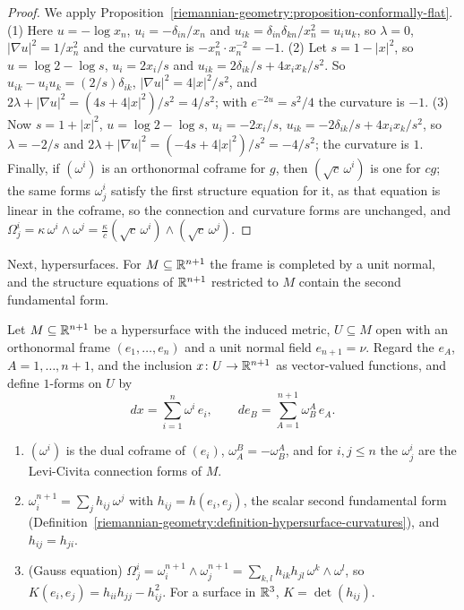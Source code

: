 \begin{proof}
We apply Proposition~\ref{riemannian-geometry:proposition-conformally-flat}. (1) Here $u = -\log x_n$, $u_i = -\delta_{in}/x_n$ and $u_{ik} = \delta_{in}\delta_{kn}/x_n^2 = u_iu_k$, so $\lambda = 0$,
$|\nabla u|^2 = 1/x_n^2$ and the curvature is $-x_n^2 \cdot x_n^{-2} = -1$. (2) Let $s = 1 - |x|^2$, so $u = \log2 - \log s$, $u_i = 2x_i/s$ and $u_{ik} = 2\delta_{ik}/s + 4x_ix_k/s^2$. So
$u_{ik} - u_iu_k = (2/s)\delta_{ik}$, $|\nabla u|^2 = 4|x|^2/s^2$, and $2\lambda + |\nabla u|^2 = (4s + 4|x|^2)/s^2 = 4/s^2$; with $e^{-2u} = s^2/4$ the curvature is $-1$. (3) Now $s = 1 + |x|^2$,
$u = \log2 - \log s$, $u_i = -2x_i/s$, $u_{ik} = -2\delta_{ik}/s + 4x_ix_k/s^2$, so $\lambda = -2/s$ and $2\lambda + |\nabla u|^2 = (-4s + 4|x|^2)/s^2 = -4/s^2$; the curvature is $1$. Finally, if
$(\omega^i)$ is an orthonormal coframe for $g$, then $(\sqrt c\,\omega^i)$ is one for $cg$; the same forms $\omega^i_j$ satisfy the first structure equation for it, as that equation is linear
in the coframe, so the connection and curvature forms are unchanged, and $\Omega^i_j = \kappa\,\omega^i \wedge \omega^j = \frac{\kappa}{c}(\sqrt c\,\omega^i) \wedge (\sqrt c\,\omega^j)$.
\end{proof}

Next, hypersurfaces. For $M \subseteq \mathbb{R}^{n+1}$ the frame is completed by a unit normal, and the structure equations of $\mathbb{R}^{n+1}$ restricted to $M$ contain the second fundamental form.

\begin{proposition}\label{riemannian-geometry:proposition-hypersurface-frames}
Let $M \subseteq \mathbb{R}^{n+1}$ be a hypersurface with the induced metric, $U \subseteq M$ open with an orthonormal frame $(e_1, \ldots, e_n)$ and a unit normal field $e_{n+1} = \nu$. Regard the $e_A$,
$A = 1, \ldots, n + 1$, and the inclusion $x \colon U \to \mathbb{R}^{n+1}$ as vector-valued functions, and define $1$-forms on $U$ by
\[
dx = \sum_{i=1}^n\omega^i\,e_i, \qquad de_B = \sum_{A=1}^{n+1}\omega^A_B\,e_A .
\]
\begin{enumerate}
\item $(\omega^i)$ is the dual coframe of $(e_i)$, $\omega^B_A = -\omega^A_B$, and for $i, j \leq n$ the $\omega^i_j$ are the Levi-Civita connection forms of $M$.
\item $\omega^{n+1}_i = \sum_jh_{ij}\,\omega^j$ with $h_{ij} = h(e_i, e_j)$, the scalar second fundamental form (Definition~\ref{riemannian-geometry:definition-hypersurface-curvatures}), and $h_{ij} = h_{ji}$.
\item (Gauss equation) $\Omega^i_j = \omega^{n+1}_i \wedge \omega^{n+1}_j = \sum_{k,l}h_{ik}h_{jl}\,\omega^k \wedge \omega^l$, so $K(e_i, e_j) = h_{ii}h_{jj} - h_{ij}^2$. For a surface in $\mathbb{R}^3$, $K = \det(h_{ij})$.
\end{enumerate}
\end{proposition}

